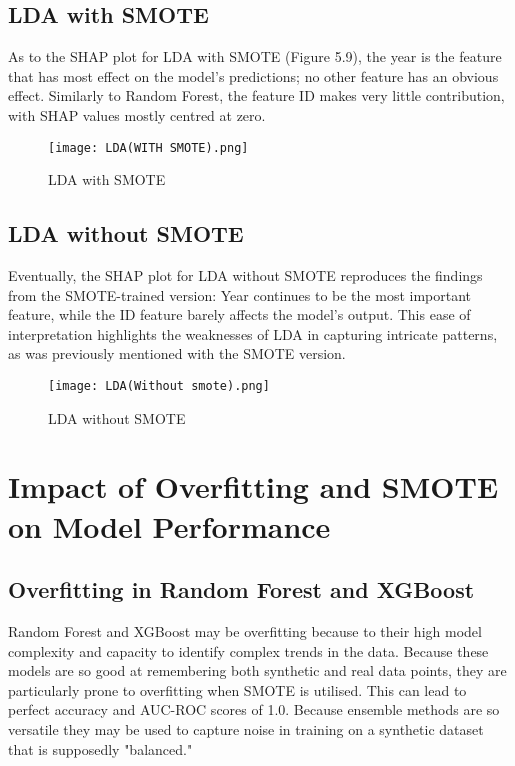 \documentclass[12pt, a4paper,oneside]{book}
\numberwithin{equation}{section}
\begin{document}
\newpage
\subsection{ LDA with SMOTE}
As to the SHAP plot for LDA with SMOTE (Figure 5.9), the year is the feature that has most effect on the model's predictions; no other feature has an obvious effect. Similarly to Random Forest, the feature ID makes very little contribution, with SHAP values mostly centred at zero.

\begin{figure}[ht]
    \centering
    \texttt{[image: LDA(WITH SMOTE).png]}
    \caption{LDA with SMOTE}
    \label{fig:enter-label}
\end{figure}

\newpage
\subsection{LDA without SMOTE}
Eventually, the SHAP plot for LDA without SMOTE reproduces the findings from the SMOTE-trained version: Year continues to be the most important feature, while the ID feature barely affects the model's output. This ease of interpretation highlights the weaknesses of LDA in capturing intricate patterns, as was previously mentioned with the SMOTE version.

\begin{figure}[ht]
    \centering
    \texttt{[image: LDA(Without smote).png]}
    \caption{LDA without SMOTE}
    \label{fig:enter-label}
\end{figure}

\newpage
\section{Impact of Overfitting and SMOTE on Model Performance}
\subsection{Overfitting in Random Forest and XGBoost}
Random Forest and XGBoost may be overfitting because to their high model complexity and capacity to identify complex trends in the data. Because these models are so good at remembering both synthetic and real data points, they are particularly prone to overfitting when SMOTE is utilised. This can lead to perfect accuracy and AUC-ROC scores of 1.0. Because ensemble methods are so versatile they may be used to capture noise in training on a synthetic dataset that is supposedly "balanced."
\end{document}

